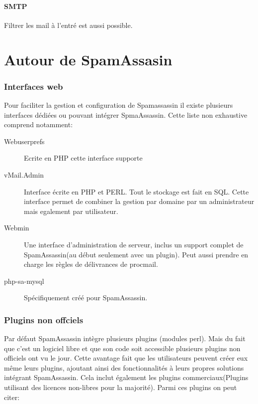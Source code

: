 \documentclass[a4paper,11pt]{article}
\begin{document}
\subsection{SMTP}

Filtrer les mail à l'entré est aussi possible. 
        

\part{Autour de SpamAssasin}

\section{Interfaces web}
Pour faciliter la gestion et configuration de Spamassassin il existe plusieurs interfaces dédiées ou pouvant intégrer 
SpmaAssassin. Cette liste non exhaustive comprend notamment:

\begin{description}
 \item [Webuserprefs] Ecrite en PHP cette interface supporte 
 \item [vMail.Admin] Interface écrite en PHP et PERL. Tout le stockage est fait en SQL. Cette interface permet 
 de combiner la gestion par domaine par un administrateur mais egalement par utilisateur.
 \item [Webmin] Une interface d'administration de serveur, inclus un support complet de SpamAssassin(au début seulement avec un plugin).
 Peut aussi prendre en charge les règles de délivrances de procmail. 
 \item [php-sa-mysql] Spécifiquement créé pour SpamAssassin. 
 
\end{description}


\begin{description}
 \item 
\end{description}


\section{Plugins non offciels}

Par défaut SpamAssassin intègre plusieurs plugins (modules perl). Mais du fait que c'est un logiciel libre et que son code soit accessible plusieurs
plugins non officiels ont vu le jour. Cette avantage fait que les utilisateurs peuvent créer eux même leurs plugins,
ajoutant ainsi des fonctionnalités à leurs propres solutions intégrant SpamAssassin. Cela inclut également les plugins commerciaux(Plugins utilisant des licences non-libres pour la majorité). 
Parmi ces plugins on peut citer:
\end{document}
